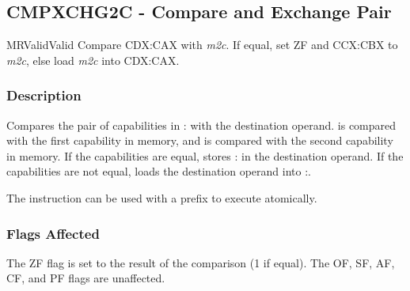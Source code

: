 \clearpage
{}
{}
\subsection*{CMPXCHG2C - Compare and Exchange Pair}

\begin{x86opcodetable}
  {MR}{Valid}{Valid}
  {Compare CDX:CAX with \emph{m2c}. If equal, set ZF and CCX:CBX to
    \emph{m2c}, else load \emph{m2c} into CDX:CAX.}
\end{x86opcodetable}

\begin{x86opentable}
\end{x86opentable}

\subsubsection*{Description}

Compares the pair of capabilities in \CDX{}:\CAX{} with the
destination operand.  \CAX{} is compared with the first capability in
memory, and \CDX{} is compared with the second capability in memory.
If the capabilities are equal, stores \CCX{}:\CBX{} in the destination
operand.  If the capabilities are not equal, loads the destination
operand into \CDX{}:\CAX{}.

The instruction can be used with a  prefix to execute
atomically.

\subsubsection*{Flags Affected}

The ZF flag is set to the result of the comparison (1 if equal).  The
OF, SF, AF, CF, and PF flags are unaffected.
